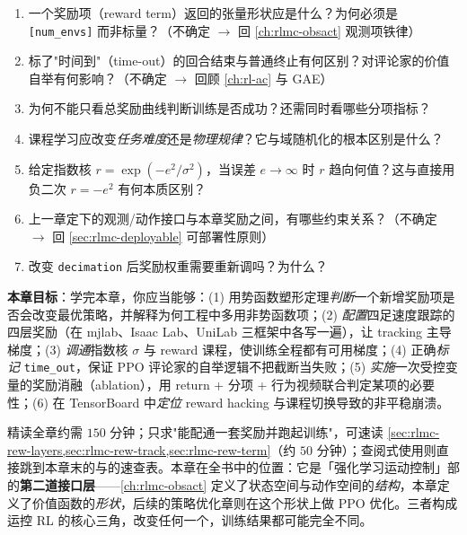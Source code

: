 \begin{practice}
\begin{enumerate}
  \item 一个奖励项（reward term）返回的张量形状应是什么？为何必须是 \verb|[num_envs]| 而非标量？（不确定 $\to$ 回 \cref{ch:rlmc-obsact} 观测项铁律）
  \item 标了"时间到"（time-out）的回合结束与普通终止有何区别？对评论家的价值自举有何影响？（不确定 $\to$ 回顾 \cref{ch:rl-ac} 与 GAE）
  \item 为何不能只看总奖励曲线判断训练是否成功？还需同时看哪些分项指标？
  \item 课程学习应改变\emph{任务难度}还是\emph{物理规律}？它与域随机化的根本区别是什么？
  \item 给定指数核 $r=\exp(-e^2/\sigma^2)$，当误差 $e\to\infty$ 时 $r$ 趋向何值？这与直接用负二次 $r=-e^2$ 有何本质区别？
  \item 上一章定下的观测/动作接口与本章奖励之间，有哪些约束关系？（不确定 $\to$ 回 \cref{sec:rlmc-deployable} 可部署性原则）
  \item 改变 \verb|decimation| 后奖励权重需要重新调吗？为什么？
\end{enumerate}
\end{practice}

\textbf{本章目标}：学完本章，你应当能够：(1) 用势函数塑形定理\emph{判断}一个新增奖励项是否会改变最优策略，并解释为何工程中多用非势函数项；(2) \emph{配置}四足速度跟踪的四层奖励（在 mjlab、Isaac Lab、UniLab 三框架中各写一遍），让 tracking 主导梯度；(3) \emph{调通}指数核 $\sigma$ 与 reward 课程，使训练全程都有可用梯度；(4) 正确\emph{标记} \verb|time_out|，保证 PPO 评论家的自举逻辑不把截断当失败；(5) \emph{实施}一次受控变量的奖励消融（ablation），用 return + 分项 + 行为视频联合判定某项的必要性；(6) 在 TensorBoard 中\emph{定位} reward hacking 与课程切换导致的非平稳崩溃。

\begin{note}[阅读时间与导航]
精读全章约需 $150$ 分钟；只求"能配通一套奖励并跑起训练"，可速读 \cref{sec:rlmc-rew-layers,sec:rlmc-rew-track,sec:rlmc-rew-term}（约 $50$ 分钟）；查阅式使用则直接跳到本章末的与的速查表。本章在全书中的位置：它是「强化学习运动控制」部的\textbf{第二道接口层}——\cref{ch:rlmc-obsact} 定义了状态空间与动作空间的\emph{结构}，本章定义了价值函数的\emph{形状}，后续的策略优化章则在这个形状上做 PPO 优化。三者构成运控 RL 的核心三角，改变任何一个，训练结果都可能完全不同。
\end{note}

